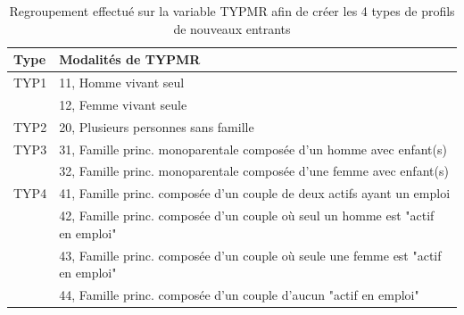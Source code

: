 \documentclass{bredele}
\begin{document}
\begin{table}\centering
\begin{tabular}[width=\textwidth]{|l|l|} 
   \hline
    \large{Type} & \large{Modalités de TYPMR} \\
    \hline
    TYP1 & 11, Homme vivant seul\\
    \cline{2-2} 
        & 12, Femme vivant seule\\
	  \hline
    TYP2 & 20, Plusieurs personnes sans famille\\
		\hline
    TYP3 & 31, Famille princ. monoparentale composée d'un homme avec enfant(s)\\
    \cline{2-2} 
        & 32, Famille princ. monoparentale composée d'une femme avec enfant(s)\\						
    \hline
		TYP4 & 41, Famille princ. composée d'un couple de deux actifs ayant un emploi\\
    \cline{2-2} 
        & 42, Famille princ. composée d'un couple où seul un homme est "actif en emploi"\\						
		\cline{2-2} 
        & 43, Famille princ. composée d'un couple où seule une femme est "actif en emploi"\\						
		\cline{2-2} 
        & 44, Famille princ. composée d'un couple d’aucun "actif en emploi"\\	
		\hline
\end{tabular}
\caption{Regroupement effectué sur la variable TYPMR afin de créer les 4 types de profils de nouveaux entrants}
\begin{flushright}
\end{flushright}
\end{table}
\newpage
\end{document}
